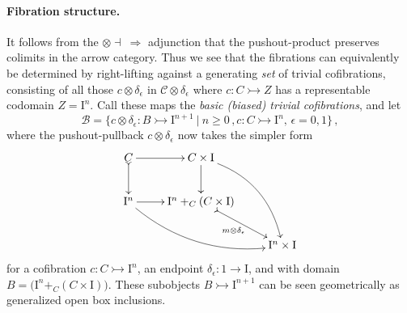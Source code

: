 \documentclass[11pt]{article}
\newcommand{\mono}{\ensuremath{\rightarrowtail}}
\newcommand{\I}{\ensuremath{\mathrm{I}}}
\theoremstyle{remark}
\theoremstyle{definition}
\begin{document}
\paragraph{Fibration structure.}
It follows from the $\otimes\dashv\ \Rightarrow$ adjunction that the pushout-product preserves colimits in the arrow category.  Thus we see that the fibrations can equivalently be determined by right-lifting against a generating \emph{set} of trivial cofibrations, consisting of all those $c \otimes \delta_\epsilon$ in $\mathcal{C}\otimes \delta_\epsilon$ where $c : C \mono Z$ has a representable codomain $Z=\I^n$.  Call these maps the \emph{basic (biased) trivial cofibrations}, and let 
\begin{equation}\label{eq:basictrivcof}
\mathcal{B} = \{c \otimes \delta_\epsilon : B \mono \I^{n+1}\ |\ n\geq 0\,, c : C\mono \I^n,\,\epsilon = 0,1\}\,,
\end{equation}
where the pushout-pullback $c\otimes\delta_\epsilon$ now takes the simpler form
\begin{equation}\label{diagram:basicpushoutproduct}
\xymatrix{
C \ar@{>->}[d] \ar[r] & C\times \I \ar[d] \ar@/^4ex/ [rdd]\\
\I^{n} \ar@/_4ex/ [rrd] \ar[r] &  \I^n +_C (C\times\I) \ar@{>->}[rd]_{m \otimes \delta_\epsilon} \\
&& \I^{n}\times\I
}
\end{equation}
for a cofibration $c : C\mono \I^n$, an endpoint $\delta_\epsilon:1 \to \I$, and with domain $B = \big(\I^n +_C (C\times\I)\big)$.   These subobjects $B \mono \I^{n+1}$ can be seen geometrically as generalized open box inclusions.
\end{document}
